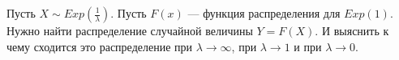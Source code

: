 \documentclass[12pt, a4paper, oneside]{article}
\begin{document}




\begin{problem}{ }
Пусть $X \sim Exp\left(\frac{1}{\lambda} \right)$. Пусть $F(x)$ — функция распределения для $Exp(1)$. Нужно найти распределение случайной величины $Y = F(X)$. И выяснить к чему сходится это распределение при $\lambda \to \infty$, при $\lambda \to 1$ и при $\lambda \to 0$.
\end{problem} 






\end{document}

